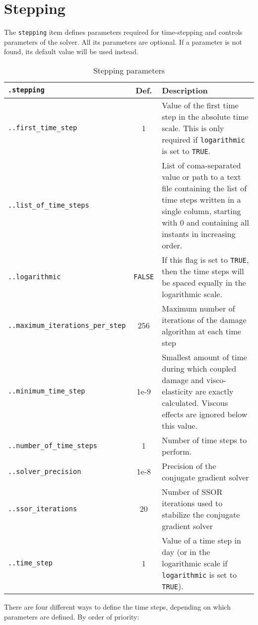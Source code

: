 \documentclass[10pt]{article}
\begin{document}
\section{Stepping}

The \verb+stepping+ item defines parameters required for time-stepping and controls parameters of the solver.
All its parameters are optional.
If a parameter is not found, its default value will be used instead.\\

\begin{table}[h!]
\begin{tabularx}{\textwidth}{lcX}
\verb+.stepping+ &  Def. & Description \\
\hline
\verb+..first_time_step+ & 1 & Value of the first time step in the absolute time scale. This is only required if \verb+logarithmic+ is set to \verb+TRUE+.\\
\verb+..list_of_time_steps+ & & List of coma-separated value or path to a text file containing the list of time steps written in a single column, starting with 0 and containing all instants in increasing order. \\
\verb+..logarithmic+ & \verb+FALSE+ & If this flag is set to \verb+TRUE+, then the time steps will be spaced equally in the logarithmic scale.\\
\verb+..maximum_iterations_per_step+ & 256 & Maximum number of iterations of the damage algorithm at each time step\\
\verb+..minimum_time_step+ & 1e-9 & Smallest amount of time during which coupled damage and visco-elasticity are exactly calculated. Viscous effects are ignored below this value.\\
\verb+..number_of_time_steps+ & 1 & Number of time steps to perform.\\
\verb+..solver_precision+ & 1e-8 & Precision of the conjugate gradient solver \\
\verb+..ssor_iterations+ & 20 & Number of SSOR iterations used to stabilize the conjugate gradient solver \\
\verb+..time_step+ & 1 & Value of a time step in day (or in the logarithmic scale if \verb+logarithmic+ is set to \verb+TRUE+).\\
\hline
\end{tabularx}
\caption{Stepping parameters}
\end{table}

There are four different ways to define the time steps, depending on which parameters are defined.
By order of priority:
\end{document}
